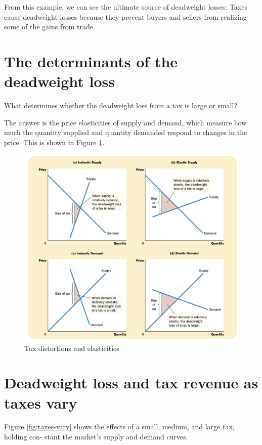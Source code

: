 From this example, we can see the ultimate source of deadweight losses: Taxes cause deadweight losses because they prevent buyers and sellers from realizing some of the gains from trade.



\section{The determinants of the deadweight loss}

What determines whether the deadweight loss from a tax is large or small?

The answer is the price elasticities of supply and demand, which measure how much the quantity supplied and quantity demanded respond to changes in the price.
This is shown in Figure \ref{fig:tax-distortions-and-elasticities}.
\begin{figure}[!ht]
  \centering
  \includegraphics[width=\textwidth]{pics/tax-distortions-and-elasticities}
  \caption{Tax distortions and elasticities}
  \label{fig:tax-distortions-and-elasticities}
\end{figure}


\section{Deadweight loss and tax revenue as taxes vary}

Figure \ref{fig:taxes-vary} shows the effects of a small, medium, and large tax, holding con- stant the market’s supply and demand curves. 

